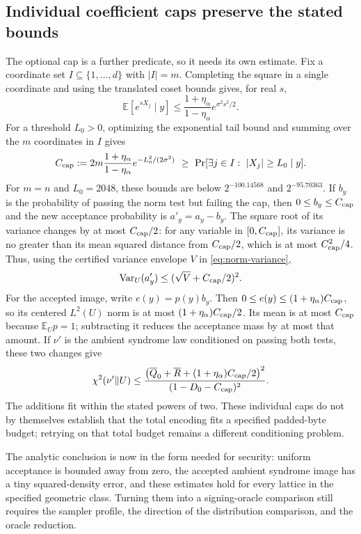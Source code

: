 \documentclass[11pt,a4paper]{article}
\newcommand{\E}{\mathbb E}
\theoremstyle{definition}
\theoremstyle{remark}
\numberwithin{equation}{section}
\begin{document}
\subsection{Individual coefficient caps preserve the stated bounds}

The optional cap is a further predicate, so it needs its own estimate.
Fix a coordinate set $I\subseteq\{1,\ldots,d\}$ with $|I|=m$.
Completing the square in a single coordinate and using the translated
coset bounds gives, for real $s$,
\[
 \E[e^{sX_j}\mid y]
 \le\frac{1+\eta_\alpha}{1-\eta_\alpha}e^{\sigma^2s^2/2}.
\]
For a threshold $L_0>0$, optimizing the exponential tail bound and summing
over the $m$ coordinates in $I$ gives
\[
 C_{\rm cap}:=
 2m\frac{1+\eta_\alpha}{1-\eta_\alpha}
 e^{-L_0^2/(2\sigma^2)}
 \ \ge\ \Pr[\exists j\in I:\ |X_j|\ge L_0\mid y].
\]
For $m=n$ and $L_0=2048$, these bounds are below $2^{-100.14568}$
and $2^{-95.70363}$. If $b_y$ is the probability of passing the norm
test but failing the cap, then $0\le b_y\le C_{\rm cap}$ and the new
acceptance probability is $a'_y=a_y-b_y$. The square root of its variance changes
by at most $C_{\rm cap}/2$: for any variable in $[0,C_{\rm cap}]$, its variance is no greater than its mean squared distance from $C_{\rm cap}/2$, which is at most $C_{\rm cap}^2/4$. Thus, using the certified variance envelope $V$ in \eqref{eq:norm-variance},
\[
 \operatorname{Var}_U(a'_y)
 \le(\sqrt V+C_{\rm cap}/2)^2.
\]
For the accepted image, write $e(y)=p(y)b_y$. Then
$0\le e(y)\le(1+\eta_\alpha)C_{\rm cap}$, so its centered $L^2(U)$
norm is at most $(1+\eta_\alpha)C_{\rm cap}/2$. Its mean is at most
$C_{\rm cap}$ because $\E_U p=1$; subtracting it reduces the acceptance
mass by at most that amount. If $\nu'$ is the ambient syndrome law
conditioned on passing both tests, these two changes give
\[
 \chi^2(\nu'\Vert U)
 \le\frac{\bigl(\overline Q_0+\overline R+(1+\eta_\alpha)C_{\rm cap}/2\bigr)^2}
 {(1-D_0-C_{\rm cap})^2}.
\]
The additions fit within the stated powers of two. These individual caps
do not by themselves establish that the total encoding fits a specified
padded-byte budget; retrying on that total budget remains a different
conditioning problem.

The analytic conclusion is now in the form needed for security:
uniform acceptance is bounded away from zero, the accepted ambient
syndrome image has a tiny squared-density error, and these estimates
hold for every lattice in the specified geometric class. Turning them
into a signing-oracle comparison still requires the sampler profile,
the direction of the distribution comparison, and the oracle reduction.
\end{document}
